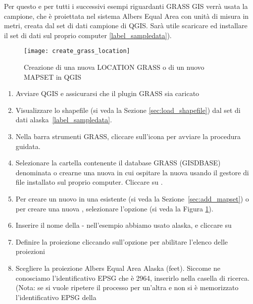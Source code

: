 Per questo e per tutti i successivi esempi riguardanti GRASS GIS verrà usata la  campione, che è proiettata nel sistema Albers Equal Area con unità di
misura in metri, creata dal set di dati campione di QGIS. Sarà utile scaricare
ed installare il set di dati sul proprio computer \ref{label_sampledata}).

\begin{figure}[ht]
\begin{center}
\caption{Creazione di una nuova LOCATION GRASS o di un nuovo MAPSET in QGIS \nixcaption}
\label{fig:create_grass_location}\smallskip
\texttt{[image: create\_grass\_location]}
\end{center}  
\end{figure}

\begin{enumerate}
  \item Avviare QGIS e assicurarsi che il plugin GRASS sia caricato
  \item Visualizzare lo shapefile  (si veda la Sezione
  \ref{sec:load_shapefile}) dal set di dati alaska~\ref{label_sampledata}.
  \item Nella barra strumenti GRASS, cliccare sull'icona
   per avviare la procedura guidata.
  \item Selezionare la cartella contenente il database GRASS (GISDBASE)
  denominata  o crearne una nuova in cui ospitare la nuova
   usando il gestore di file installato sul proprio
  computer. Cliccare su . 
  \item Per creare un nuovo  in una 
  esistente (si veda la Sezione~\ref{sec:add_mapset}) o per creare una nuova
  , selezionare l'opzione  (si veda la Figura \ref{fig:create_grass_location}).
  \item Inserire il nome della  - nell'esempio abbiamo
  usato alaska, e cliccare su  
  \item Definire la proiezione cliccando sull'opzione
   per abilitare l'elenco delle proiezioni 
  \item Scegliere la proiezione Albers Equal Area Alaska (feet). Siccome ne
  conosciamo l'identificativo EPSG che è 2964, inserirlo nella casella di
  ricerca. (Nota: se si vuole ripetere il processo per un'altra
   e non si è memorizzato l'identificativo EPSG della

\end{enumerate}
